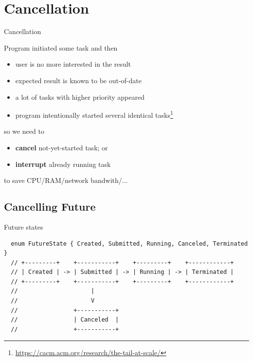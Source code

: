 \section{Cancellation}
\showTOC

\begin{frame}{Cancellation}

Program initiated some task and then
\begin{itemize}
    \item user is no more interested in the result
    \item expected result is known to be out-of-date
    \item a lot of tasks with higher priority appeared
    \item program intentionally started several identical tasks\footnote{\tiny\url{https://cacm.acm.org/research/the-tail-at-scale/}}
\end{itemize}

so we need to
\begin{itemize}
    \pause \item \textbf{cancel} not-yet-started task; or
    \pause \item \textbf{interrupt} already running task    
\end{itemize}
to save CPU/RAM/network bandwith/...
\end{frame}


\subsection{Cancelling Future}

\begin{frame}[t,fragile]{Future states}

\begin{verbatim}
  enum FutureState { Created, Submitted, Running, Canceled, Terminated }
  // +---------+    +-----------+    +---------+    +------------+
  // | Created | -> | Submitted | -> | Running | -> | Terminated |
  // +---------+    +-----------+    +---------+    +------------+
  //                     |
  //                     V
  //                +-----------+
  //                | Canceled  |
  //                +-----------+
\end{verbatim}
\end{frame}

